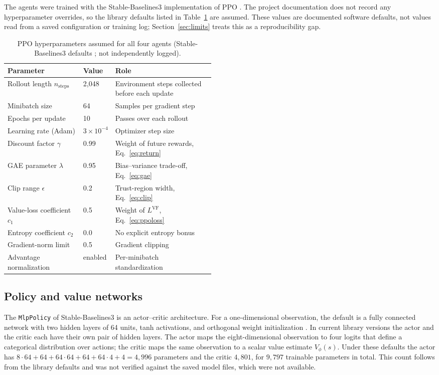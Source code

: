 \documentclass[11pt,a4paper]{article}
\begin{document}
The agents were trained with the Stable-Baselines3 implementation of PPO \cite{raffin2021,sb3ppo}. The project documentation does not record any hyperparameter overrides, so the library defaults listed in Table~\ref{tab:hyper} are assumed. These values are documented software defaults, not values read from a saved configuration or training log; Section~\ref{sec:limits} treats this as a reproducibility gap.

\begin{table}[!htb]
\caption[Assumed PPO hyperparameters]{PPO hyperparameters assumed for all four agents (Stable-Baselines3 defaults \cite{sb3ppo}; not independently logged).}\label{tab:hyper}
\centering\small
\begin{tabular}{@{}llp{0.48\linewidth}@{}}
\toprule
Parameter & Value & Role \\
\midrule
Rollout length $n_\text{steps}$ & 2{,}048 & Environment steps collected before each update \\
Minibatch size & 64 & Samples per gradient step \\
Epochs per update & 10 & Passes over each rollout \\
Learning rate (Adam) & $3\times10^{-4}$ & Optimizer step size \\
Discount factor $\gamma$ & 0.99 & Weight of future rewards, Eq.~\eqref{eq:return} \\
GAE parameter $\lambda$ & 0.95 & Bias--variance trade-off, Eq.~\eqref{eq:gae} \\
Clip range $\epsilon$ & 0.2 & Trust-region width, Eq.~\eqref{eq:clip} \\
Value-loss coefficient $c_1$ & 0.5 & Weight of $L^{\text{VF}}$, Eq.~\eqref{eq:ppoloss} \\
Entropy coefficient $c_2$ & 0.0 & No explicit entropy bonus \\
Gradient-norm limit & 0.5 & Gradient clipping \\
Advantage normalization & enabled & Per-minibatch standardization \\
\bottomrule
\end{tabular}
\end{table}

\subsection{Policy and value networks}

The \texttt{MlpPolicy} of Stable-Baselines3 is an actor--critic architecture. For a one-dimensional observation, the default is a fully connected network with two hidden layers of 64 units, tanh activations, and orthogonal weight initialization \cite{sb3policy,sb3ppo}. In current library versions the actor and the critic each have their own pair of hidden layers. The actor maps the eight-dimensional observation to four logits that define a categorical distribution over actions; the critic maps the same observation to a scalar value estimate $V_\phi(s)$. Under these defaults the actor has $8\cdot64+64+64\cdot64+64+64\cdot4+4 = 4{,}996$ parameters and the critic $4{,}801$, for $9{,}797$ trainable parameters in total. This count follows from the library defaults and was not verified against the saved model files, which were not available.
\end{document}
